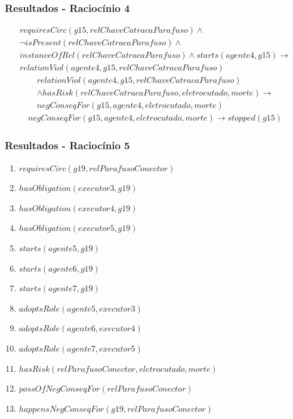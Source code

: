 \documentclass{beamer}
\begin{document}
\begin{frame}
	\frametitle{Resultados - Raciocínio 4}
	\begin{eqnarray} \nonumber
		requiresCirc(g15,relChaveCatracaParafuso)\wedge  \nonumber \\
		\neg isPresent(relChaveCatracaParafuso) \wedge \nonumber \\
		instanceOfRel(relChaveCatracaParafuso) \wedge starts(agente4,g15) \to \nonumber \\
		relationViol(agente4,g15,relChaveCatracaParafuso)
	\end{eqnarray}
	\begin{eqnarray}\nonumber
		relationViol(agente4,g15,relChaveCatracaParafuso) \nonumber \\ 
		 \wedge hasRisk(relChaveCatracaParafuso,eletrocutado,morte) \to \nonumber \\ 
		negConseqFor(g15,agente4,eletrocutado,morte)
	\end{eqnarray}	
	\begin{eqnarray}
		negConseqFor(g15,agente4,eletrocutado,morte) \to stopped(g15)
	\end{eqnarray}
\end{frame}

\begin{frame}
	\frametitle{Resultados - Raciocínio 5}
	\begin{enumerate}
		\item $requiresCirc(g19,relParafusoConector)$		
		\item $hasObligation(executor3,g19)$
		\item $hasObligation(executor4,g19)$
		\item $hasObligation(executor5,g19)$		
		\item $starts(agente5,g19)$
		\item $starts(agente6,g19)$
		\item $starts(agente7,g19)$									
		\item $adoptsRole(agente5,executor3)$
		\item $adoptsRole(agente6,executor4)$
		\item $adoptsRole(agente7,executor5)$
		\item $hasRisk(relParafusoConector,eletrocutado,morte)$
		\item $possOfNegConseqFor(relParafusoConector)$
		\item $happensNegConseqFor(g19,relParafusoConector)$	
	\end{enumerate}
\end{frame}
\end{document}
